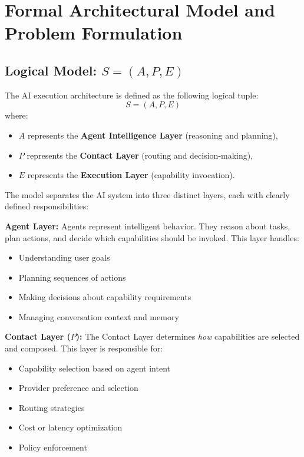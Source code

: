 \section{Formal Architectural Model and Problem Formulation}

\subsection{Logical Model: $S = (A, P, E)$}

The AI execution architecture is defined as the following logical tuple:
\[
S = (A, P, E)
\]
where:
\begin{itemize}
    \item $A$ represents the \textbf{Agent Intelligence Layer} (reasoning and planning),
    \item $P$ represents the \textbf{Contact Layer} (routing and decision-making),
    \item $E$ represents the \textbf{Execution Layer} (capability invocation).
\end{itemize}

The model separates the AI system into three distinct layers, each with clearly defined responsibilities:

\textbf{Agent Layer:} Agents represent intelligent behavior. They reason about tasks, plan actions, and decide which capabilities should be invoked. This layer handles:
\begin{itemize}
    \item Understanding user goals
    \item Planning sequences of actions
    \item Making decisions about capability requirements
    \item Managing conversation context and memory
\end{itemize}

\textbf{Contact Layer ($P$):} The Contact Layer determines \emph{how} capabilities are selected and composed. This layer is responsible for:
\begin{itemize}
    \item Capability selection based on agent intent
    \item Provider preference and selection
    \item Routing strategies
    \item Cost or latency optimization
    \item Policy enforcement
\end{itemize}

